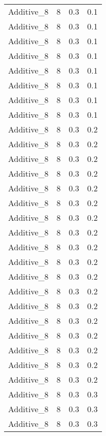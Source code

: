 \documentclass{article}
\begin{document}
\begin{longtable}[H]{lrrr}
 Additive\_8 &       8 &   0.3 &            0.1 \\
 Additive\_8 &       8 &   0.3 &            0.1 \\
 Additive\_8 &       8 &   0.3 &            0.1 \\
 Additive\_8 &       8 &   0.3 &            0.1 \\
 Additive\_8 &       8 &   0.3 &            0.1 \\
 Additive\_8 &       8 &   0.3 &            0.1 \\
 Additive\_8 &       8 &   0.3 &            0.1 \\
 Additive\_8 &       8 &   0.3 &            0.1 \\
 Additive\_8 &       8 &   0.3 &            0.2 \\
 Additive\_8 &       8 &   0.3 &            0.2 \\
 Additive\_8 &       8 &   0.3 &            0.2 \\
 Additive\_8 &       8 &   0.3 &            0.2 \\
 Additive\_8 &       8 &   0.3 &            0.2 \\
 Additive\_8 &       8 &   0.3 &            0.2 \\
 Additive\_8 &       8 &   0.3 &            0.2 \\
 Additive\_8 &       8 &   0.3 &            0.2 \\
 Additive\_8 &       8 &   0.3 &            0.2 \\
 Additive\_8 &       8 &   0.3 &            0.2 \\
 Additive\_8 &       8 &   0.3 &            0.2 \\
 Additive\_8 &       8 &   0.3 &            0.2 \\
 Additive\_8 &       8 &   0.3 &            0.2 \\
 Additive\_8 &       8 &   0.3 &            0.2 \\
 Additive\_8 &       8 &   0.3 &            0.2 \\
 Additive\_8 &       8 &   0.3 &            0.2 \\
 Additive\_8 &       8 &   0.3 &            0.2 \\
 Additive\_8 &       8 &   0.3 &            0.2 \\
 Additive\_8 &       8 &   0.3 &            0.3 \\
 Additive\_8 &       8 &   0.3 &            0.3 \\
 Additive\_8 &       8 &   0.3 &            0.3 \\

\end{longtable}
\end{document}
